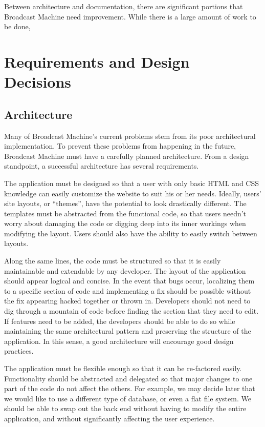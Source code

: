 \documentclass[a4paper,12pt]{report}
\begin{document}
Between architecture and documentation, there are significant portions that Broadcast Machine need improvement. While there is a large amount of work to be done,


\chapter{Requirements and Design Decisions}

\section{Architecture}

	Many of Broadcast Machine’s current problems stem from its poor architectural implementation. 
To prevent these problems from happening in the future, Broadcast Machine must have a carefully planned architecture. 
From a design standpoint, a successful architecture has several requirements.

The application must be designed so that a user with only basic HTML and CSS knowledge can easily customize the website to suit his or her needs. 
Ideally, users’ site layouts, or “themes”, have the potential to look drastically different. 
The templates must be abstracted from the functional code, so that users needn’t worry about damaging the code or digging deep into its inner workings when modifying the layout. 
Users should also have the ability to easily switch between layouts.

Along the same lines, the code must be structured so that it is easily maintainable and extendable by any developer. 
The layout of the application should appear logical and concise. 
In the event that bugs occur, localizing them to a specific section of code and implementing a fix should be possible without the fix appearing hacked together or thrown in. 
Developers should not need to dig through a mountain of code before finding the section that they need to edit. 
If features need to be added, the developers should be able to do so while maintaining the same architectural pattern and preserving the structure of the application. 
In this sense, a good architecture will encourage good design practices.

The application must be flexible enough so that it can be re-factored easily. Functionality should be abstracted and delegated so that major changes to one part of the code do not affect the others. 
For example, we may decide later that we would like to use a different type of database, or even a flat file system. We should be able to swap out the back end without having to modify the entire application, and without significantly affecting the user experience.
\end{document}

